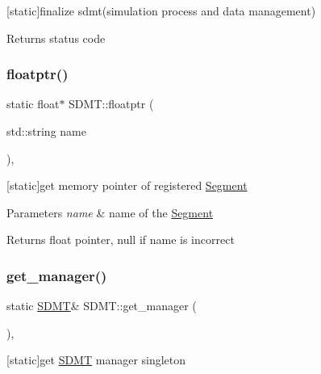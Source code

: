 \mbox{[}static\mbox{]}finalize sdmt(simulation process and data management) 

\begin{DoxyReturn}{Returns}
status code 
\end{DoxyReturn}
\mbox{\label{class_s_d_m_t_a44a9454c55626de3cf5e9b37b9016d6c}} 
\subsubsection{\texorpdfstring{floatptr()}{floatptr()}}
{\footnotesize\ttfamily static float$\ast$ S\+D\+M\+T\+::floatptr (\begin{DoxyParamCaption}\item[{std\+::string}]{name }\end{DoxyParamCaption})\hspace{0.3cm}{\ttfamily [inline]}, {\ttfamily [static]}}



\mbox{[}static\mbox{]}get memory pointer of registered \hyperlink{struct_s_d_m_t_1_1_segment}{Segment} 


\begin{DoxyParams}{Parameters}
{\em name} & name of the \hyperlink{struct_s_d_m_t_1_1_segment}{Segment} \\
\hline
\end{DoxyParams}
\begin{DoxyReturn}{Returns}
float pointer, null if name is incorrect 
\end{DoxyReturn}
\mbox{\label{class_s_d_m_t_a58f43a16728b4d990ca10c1efe70740f}} 
\subsubsection{\texorpdfstring{get\+\_\+manager()}{get\_manager()}}
{\footnotesize\ttfamily static \hyperlink{class_s_d_m_t}{S\+D\+MT}\& S\+D\+M\+T\+::get\+\_\+manager (\begin{DoxyParamCaption}{ }\end{DoxyParamCaption})\hspace{0.3cm}{\ttfamily [inline]}, {\ttfamily [static]}}



\mbox{[}static\mbox{]}get \hyperlink{class_s_d_m_t}{S\+D\+MT} manager singleton 

